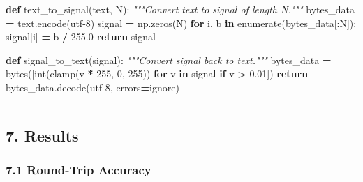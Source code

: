 \documentclass[
  11pt,
  a4paper,
]{article}
\newenvironment{Shaded}{\begin{snugshade}}{\end{snugshade}}
\newcommand{\BuiltInTok}[1]{#1}
\newcommand{\CommentTok}[1]{\textcolor[rgb]{0.56,0.35,0.01}{\textit{#1}}}
\newcommand{\ControlFlowTok}[1]{\textcolor[rgb]{0.13,0.29,0.53}{\textbf{#1}}}
\newcommand{\DecValTok}[1]{\textcolor[rgb]{0.00,0.00,0.81}{#1}}
\newcommand{\FloatTok}[1]{\textcolor[rgb]{0.00,0.00,0.81}{#1}}
\newcommand{\KeywordTok}[1]{\textcolor[rgb]{0.13,0.29,0.53}{\textbf{#1}}}
\newcommand{\NormalTok}[1]{#1}
\newcommand{\OperatorTok}[1]{\textcolor[rgb]{0.81,0.36,0.00}{\textbf{#1}}}
\newcommand{\StringTok}[1]{\textcolor[rgb]{0.31,0.60,0.02}{#1}}
\begin{document}
\begin{Shaded}
\begin{Highlighting}[]
\KeywordTok{def}\NormalTok{ text\_to\_signal(text, N):}
    \CommentTok{"""Convert text to signal of length N."""}
\NormalTok{    bytes\_data }\OperatorTok{=}\NormalTok{ text.encode(}\StringTok{\textquotesingle{}utf{-}8\textquotesingle{}}\NormalTok{)}
\NormalTok{    signal }\OperatorTok{=}\NormalTok{ np.zeros(N)}
    \ControlFlowTok{for}\NormalTok{ i, b }\KeywordTok{in} \BuiltInTok{enumerate}\NormalTok{(bytes\_data[:N]):}
\NormalTok{        signal[i] }\OperatorTok{=}\NormalTok{ b }\OperatorTok{/} \FloatTok{255.0}
    \ControlFlowTok{return}\NormalTok{ signal}

\KeywordTok{def}\NormalTok{ signal\_to\_text(signal):}
    \CommentTok{"""Convert signal back to text."""}
\NormalTok{    bytes\_data }\OperatorTok{=} \BuiltInTok{bytes}\NormalTok{([}\BuiltInTok{int}\NormalTok{(clamp(v }\OperatorTok{*} \DecValTok{255}\NormalTok{, }\DecValTok{0}\NormalTok{, }\DecValTok{255}\NormalTok{)) }\ControlFlowTok{for}\NormalTok{ v }\KeywordTok{in}\NormalTok{ signal }\ControlFlowTok{if}\NormalTok{ v }\OperatorTok{\textgreater{}} \FloatTok{0.01}\NormalTok{])}
    \ControlFlowTok{return}\NormalTok{ bytes\_data.decode(}\StringTok{\textquotesingle{}utf{-}8\textquotesingle{}}\NormalTok{, errors}\OperatorTok{=}\StringTok{\textquotesingle{}ignore\textquotesingle{}}\NormalTok{)}
\end{Highlighting}
\end{Shaded}

\begin{center}\rule{0.5\linewidth}{0.5pt}\end{center}

\subsection{7. Results}\label{results}

\subsubsection{7.1 Round-Trip Accuracy}\label{round-trip-accuracy}
\end{document}
